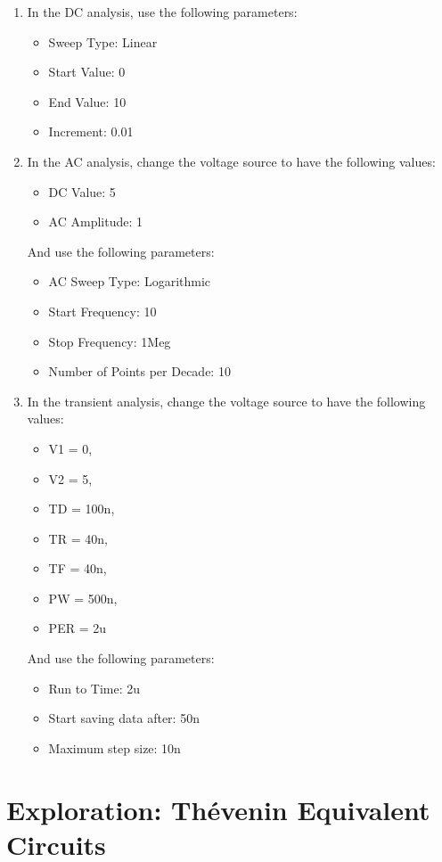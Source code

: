 \documentclass[12pt]{../manual}
\begin{document}
\begin{enumerate}
\item In the DC analysis, use the following parameters:
\begin{itemize}
\item Sweep Type: Linear
\item Start Value: 0
\item End Value: 10
\item Increment: 0.01
\end{itemize}
\item In the AC analysis, change the voltage source to have the following values:
\begin{itemize}
\item DC Value: 5
\item AC Amplitude: 1
\end{itemize}
And use the following parameters:
\begin{itemize}
\item AC Sweep Type: Logarithmic 
\item Start Frequency: 10
\item Stop Frequency: 1Meg
\item Number of Points per Decade: 10
\end{itemize}
\item In the transient analysis, change the voltage source to have the following values:
\begin{itemize}
\item V1 = 0, 
\item V2 = 5, 
\item TD = 100n, 
\item TR = 40n, 
\item TF = 40n, 
\item PW = 500n, 
\item PER = 2u
\end{itemize}
And use the following parameters:
\begin{itemize}
\item Run to Time: 2u
\item Start saving data after: 50n
\item Maximum step size: 10n
\end{itemize}
\end{enumerate}
%
\newpage
\section{Exploration: Th\'evenin Equivalent Circuits}
\end{document}
